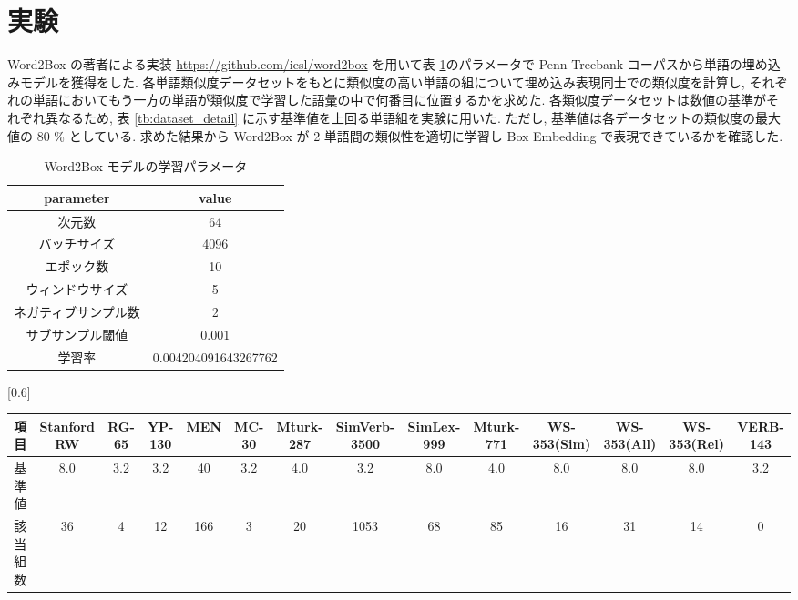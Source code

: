 \documentclass[twocolumn]{jarticle}     %
\begin{document}
\section{実験}
Word2Box の著者による実装 \url{https://github.com/iesl/word2box} を用いて表 \ref{tb:model_parameter}のパラメータで Penn Treebank コーパスから単語の埋め込みモデルを獲得をした. 
各単語類似度データセットをもとに類似度の高い単語の組について埋め込み表現同士での類似度を計算し, それぞれの単語においてもう一方の単語が類似度で学習した語彙の中で何番目に位置するかを求めた. 
各類似度データセットは数値の基準がそれぞれ異なるため, 表 \ref{tb:dataset_detail} に示す基準値を上回る単語組を実験に用いた. 
ただし, 基準値は各データセットの類似度の最大値の 80 \% としている. 
求めた結果から Word2Box が 2 単語間の類似性を適切に学習し Box Embedding で表現できているかを確認した. 

\begin{table}[t]
  \centering
  \caption{Word2Box モデルの学習パラメータ}
  \label{tb:model_parameter}
  \begin{tabular}{c|c} \hline
      parameter&value \\ \hline
      次元数&64 \\
      バッチサイズ&4096 \\ 
      エポック数&10 \\
      ウィンドウサイズ&5 \\
      ネガティブサンプル数&2 \\
      サブサンプル閾値&0.001 \\
      学習率&0.004204091643267762 \\
      \hline
  \end{tabular}
\end{table}


\begin{table*}[th]
  \centering
  \caption{類似度データセットから抽出した単語組}
  \label{tb:dataset_detail}
  \scalebox{0.6}[0.6]{
		\begin{tabular}{c|ccccccccccccc}
			\hline
			項目   & Stanford RW & RG-65 & YP-130 & MEN & MC-30 & Mturk-287 & SimVerb-3500 & SimLex-999 & Mturk-771 & WS-353(Sim) & WS-353(All) & WS-353(Rel) & VERB-143 \\ \hline
			基準値  & 8.0         & 3.2   & 3.2    & 40  & 3.2   & 4.0       & 3.2          & 8.0        & 4.0       & 8.0         & 8.0         & 8.0         & 3.2      \\
			該当組数 & 36          & 4     & 12     & 166 & 3     & 20        & 1053         & 68         & 85        & 16          & 31          & 14          & 0        \\ \hline
			\end{tabular}
  }
\end{table*}
\end{document}
